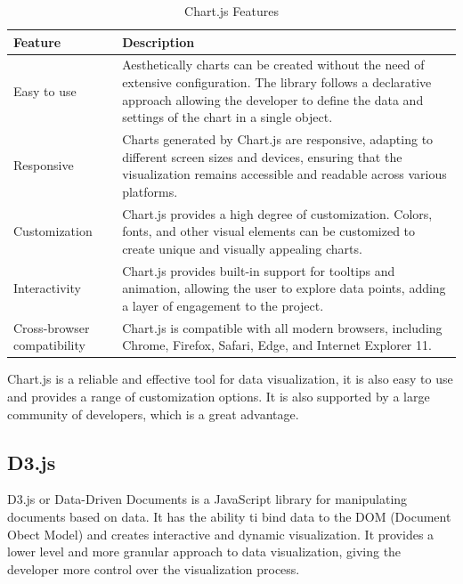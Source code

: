 \begin{table}[H]
    \centering

    \begin{tabularx}{\textwidth}{|l|X|}
        \hline
        \textbf{Feature}            & \textbf{Description}                                                                                                                                                                                                \\
        \hline
        Easy to use                 & Aesthetically charts can be created without the need of extensive configuration. The library follows a declarative approach allowing the developer to define the data and settings of the chart in a single object. \\
        \hline
        Responsive                  & Charts generated by Chart.js are responsive, adapting to different screen sizes and devices, ensuring that the visualization remains accessible and readable across various platforms.                              \\
        \hline
        Customization               & Chart.js provides a high degree of customization. Colors, fonts, and other visual elements can be customized to create unique and visually appealing charts.                                                        \\
        \hline
        Interactivity               & Chart.js provides built-in support for tooltips and animation, allowing the user to explore data points, adding a layer of engagement to the project.                                                               \\
        \hline
        Cross-browser compatibility & Chart.js is compatible with all modern browsers, including Chrome, Firefox, Safari, Edge, and Internet Explorer 11.                                                                                                 \\
        \hline
    \end{tabularx}
    \label{tab:chart-js-features}
    \caption{Chart.js Features}
\end{table}


Chart.js is a reliable and effective tool for data visualization, it is also easy to use and provides a range of customization options. It is also supported by a large community of developers, which is a great advantage.

\subsection{D3.js}
D3.js or Data-Driven Documents is a JavaScript library for manipulating documents based on data. It has the ability ti bind data to the DOM (Document Obect Model) and creates interactive and dynamic visualization. It provides a lower level and more granular approach to data visualization, giving the developer more control over the visualization process.\cite{d3}


